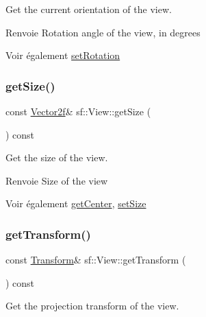 Get the current orientation of the view. 

\begin{DoxyReturn}{Renvoie}
Rotation angle of the view, in degrees
\end{DoxyReturn}
\begin{DoxySeeAlso}{Voir également}
\hyperlink{classsf_1_1View_a24d0503c9c51f5ef5918612786d325c1}{set\+Rotation} 
\end{DoxySeeAlso}
\mbox{\label{classsf_1_1View_a5432748dd3a78ac4019dfbde208c7cc1}} 
\subsubsection{\texorpdfstring{get\+Size()}{getSize()}}
{\footnotesize\ttfamily const \hyperlink{classsf_1_1Vector2}{Vector2f}\& sf\+::\+View\+::get\+Size (\begin{DoxyParamCaption}{ }\end{DoxyParamCaption}) const}



Get the size of the view. 

\begin{DoxyReturn}{Renvoie}
Size of the view
\end{DoxyReturn}
\begin{DoxySeeAlso}{Voir également}
\hyperlink{classsf_1_1View_a7f4443c194c691ae4dcf8fd9dd0eaa46}{get\+Center}, \hyperlink{classsf_1_1View_a9525b73fe9fbaceb9568faf56b399dab}{set\+Size} 
\end{DoxySeeAlso}
\mbox{\label{classsf_1_1View_a13da786526688bf99dc2cd3e658a3c2a}} 
\subsubsection{\texorpdfstring{get\+Transform()}{getTransform()}}
{\footnotesize\ttfamily const \hyperlink{classsf_1_1Transform}{Transform}\& sf\+::\+View\+::get\+Transform (\begin{DoxyParamCaption}{ }\end{DoxyParamCaption}) const}



Get the projection transform of the view. 

